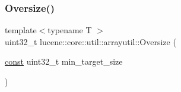 \mbox{\label{namespacelucene_1_1core_1_1util_1_1arrayutil_a88b54ef3001bf083cb1262383618c841}} 
\subsubsection{\texorpdfstring{Oversize()}{Oversize()}}
{\footnotesize\ttfamily template$<$typename T $>$ \\
uint32\+\_\+t lucene\+::core\+::util\+::arrayutil\+::\+Oversize (\begin{DoxyParamCaption}\item[{\mbox{\hyperlink{ZlibCrc32_8h_a2c212835823e3c54a8ab6d95c652660e}{const}} uint32\+\_\+t}]{min\+\_\+target\+\_\+size }\end{DoxyParamCaption})}


